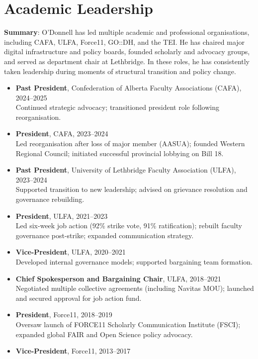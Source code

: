 \documentclass[12pt]{article}
\begin{document}
\section*{Academic Leadership}

\textbf{Summary}: O'Donnell has led multiple academic and professional organisations, including CAFA, ULFA, Force11, GO::DH, and the TEI. He has chaired major digital infrastructure and policy boards, founded scholarly and advocacy groups, and served as department chair at Lethbridge. In these roles, he has consistently taken leadership during moments of structural transition and policy change.

\begin{itemize}
  \item \textbf{Past President}, Confederation of Alberta Faculty Associations (CAFA), 2024–2025\\
  Continued strategic advocacy; transitioned president role following reorganisation.
  \item \textbf{President}, CAFA, 2023–2024\\
  Led reorganisation after loss of major member (AASUA); founded Western Regional Council; initiated successful provincial lobbying on Bill 18.
  \item \textbf{Past President}, University of Lethbridge Faculty Association (ULFA), 2023–2024\\
  Supported transition to new leadership; advised on grievance resolution and governance rebuilding.
  \item \textbf{President}, ULFA, 2021–2023\\
  Led six-week job action (92\% strike vote, 91\% ratification); rebuilt faculty governance post-strike; expanded communication strategy.
  \item \textbf{Vice-President}, ULFA, 2020–2021\\
  Developed internal governance models; supported bargaining team formation.
  \item \textbf{Chief Spokesperson and Bargaining Chair}, ULFA, 2018–2021\\
  Negotiated multiple collective agreements (including Navitas MOU); launched and secured approval for job action fund.
  \item \textbf{President}, Force11, 2018–2019\\
  Oversaw launch of FORCE11 Scholarly Communication Institute (FSCI); expanded global FAIR and Open Science policy advocacy.
  \item \textbf{Vice-President}, Force11, 2013–2017\\

\end{itemize}
\end{document}
